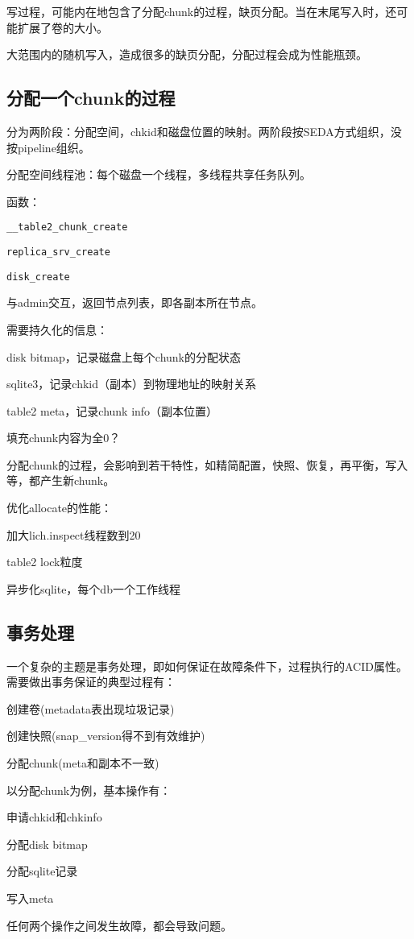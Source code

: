写过程，可能内在地包含了分配chunk的过程，缺页分配。当在末尾写入时，还可能扩展了卷的大小。

大范围内的随机写入，造成很多的缺页分配，分配过程会成为性能瓶颈。

\subsection{分配一个chunk的过程}

分为两阶段：分配空间，chkid和磁盘位置的映射。两阶段按SEDA方式组织，没按pipeline组织。

分配空间线程池：每个磁盘一个线程，多线程共享任务队列。


函数：
\begin{compactitem}
\item \verb|__table2_chunk_create|
\item \verb|replica_srv_create|
\item \verb|disk_create|
\end{compactitem}

与admin交互，返回节点列表，即各副本所在节点。

需要持久化的信息：
\begin{compactitem}
\item disk bitmap，记录磁盘上每个chunk的分配状态
\item sqlite3，记录chkid（副本）到物理地址的映射关系
\item table2 meta，记录chunk info（副本位置）
\item 填充chunk内容为全0？
\end{compactitem}

分配chunk的过程，会影响到若干特性，如精简配置，快照、恢复，再平衡，写入等，都产生新chunk。

优化allocate的性能：
\begin{compactitem}
\item 加大lich.inspect线程数到20
\item table2 lock粒度 
\item 异步化sqlite，每个db一个工作线程
\end{compactitem}

\subsection{事务处理}

一个复杂的主题是事务处理，即如何保证在故障条件下，过程执行的ACID属性。
需要做出事务保证的典型过程有：
\begin{compactenum}
\item 创建卷(metadata表出现垃圾记录)
\item 创建快照(snap\_version得不到有效维护)
\item 分配chunk(meta和副本不一致)
\end{compactenum}

以分配chunk为例，基本操作有：
\begin{compactenum}
\item 申请chkid和chkinfo
\item 分配disk bitmap
\item 分配sqlite记录
\item 写入meta
\end{compactenum}

任何两个操作之间发生故障，都会导致问题。
